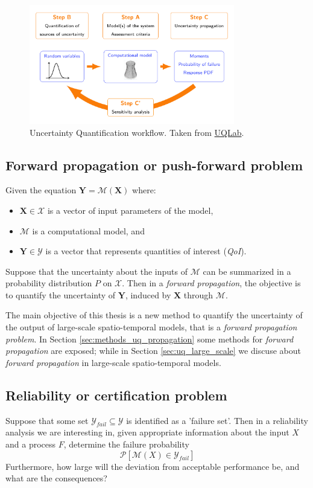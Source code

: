 \begin{figure}[H]
    \centering
    \includegraphics[width=0.8\textwidth]{img/background/UQ_steps.png}
    \caption{Uncertainty Quantification workflow. Taken from \href{http://www.uqlab.com/}{UQLab}.}
    \label{fig:uqlab_workflow}
\end{figure}

\subsection{Forward propagation or push-forward problem}\label{seq:forward}
Given the equation $\bm{Y}=\mathcal{M}(\bm{X})$ where: 
\begin{itemize}
\item $\bm{X} \in \mathcal{X} $ is a vector of  input parameters of the model,
\item $\mathcal{M}$ is a computational model, and
\item $\bm{Y} \in \mathcal{Y}$ is a vector that represents  quantities of interest (\textit{QoI}).
\end{itemize}
Suppose that the uncertainty about the inputs of $\mathcal{M}$ can be summarized in a probability distribution $P$ on $\mathcal{X}$. Then in a \textit{forward propagation}, the objective is to quantify the uncertainty of $\bm{Y}$, induced by $\bm{X}$ through $\mathcal{M}$.

The main objective of this thesis is a new method to quantify the uncertainty of the output of large-scale spatio-temporal models, that is a \textit{forward propagation problem}. In Section \ref{sec:methods_uq_propagation} some methods for \textit{forward propagation} are exposed; while in Section \ref{sec:uq_large_scale} we discuse about \textit{forward propagation} in large-scale spatio-temporal models.  

\subsection{Reliability or certification problem}\label{seq:reliability}
Suppose that some set $\mathcal{Y}_{fail}\subseteq \mathcal{Y}$ is identified as a 'failure set'. Then in a reliability analysis we are interesting in, given appropriate information about the input $X$ and a process $F$, determine the failure probability 
\begin{equation}
\mathcal{P}[\mathcal{M}(X)\in \mathcal{Y}_{fail}]
\end{equation}
Furthermore, how large will the deviation from acceptable performance be, and what are the consequences? \cite{Sullivan2015}


